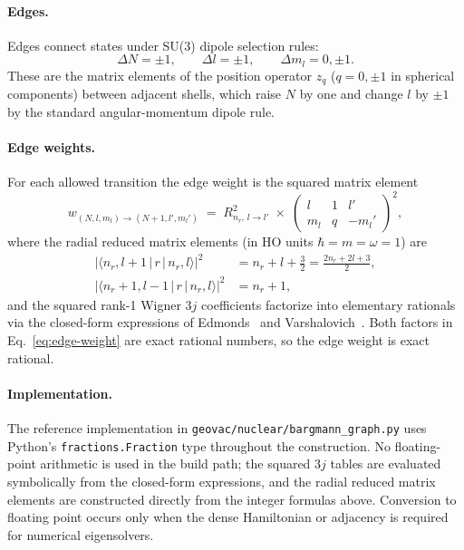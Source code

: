 \documentclass[twocolumn,pra,amsmath,amssymb,superscriptaddress]{revtex4-2}
\begin{document}
\paragraph{Edges.}
Edges connect states under SU(3) dipole selection rules:
\begin{equation}
  \Delta N = \pm 1,
  \qquad
  \Delta l = \pm 1,
  \qquad
  \Delta m_l = 0, \pm 1.
\end{equation}
These are the matrix elements of the position operator $z_q$
($q = 0, \pm 1$ in spherical components) between adjacent shells,
which raise $N$ by one and change $l$ by $\pm 1$ by the standard
angular-momentum dipole rule.

\paragraph{Edge weights.}
For each allowed transition the edge weight is the squared matrix
element
\begin{equation}
  w_{(N,l,m_l) \to (N+1,l',m_l')}
  \;=\;
  R^{2}_{n_r,\, l \to l'}
  \;\times\;
  \begin{pmatrix}
    l & 1 & l' \\
    m_l & q & -m_l'
  \end{pmatrix}^{2},
  \label{eq:edge-weight}
\end{equation}
where the radial reduced matrix elements (in HO units $\hbar = m =
\omega = 1$) are
\begin{align}
  \bigl|\langle n_r, l + 1 \,|\, r \,|\, n_r, l \rangle\bigr|^2
  &= n_r + l + \tfrac{3}{2}
  = \tfrac{2 n_r + 2 l + 3}{2},
  \\[2pt]
  \bigl|\langle n_r + 1, l - 1 \,|\, r \,|\, n_r, l \rangle\bigr|^2
  &= n_r + 1,
\end{align}
and the squared rank-1 Wigner $3j$ coefficients factorize into
elementary rationals via the closed-form expressions of
Edmonds~\cite{edmonds} and Varshalovich~\cite{varshalovich}.  Both
factors in Eq.~\eqref{eq:edge-weight} are exact rational numbers,
so the edge weight is exact rational.

\paragraph{Implementation.}
The reference implementation in
\texttt{geovac/nuclear/bargmann\_graph.py} uses Python's
\texttt{fractions.Fraction} type throughout the construction.  No
floating-point arithmetic is used in the build path; the squared
$3j$ tables are evaluated symbolically from the closed-form
expressions, and the radial reduced matrix elements are constructed
directly from the integer formulas above.  Conversion to floating
point occurs only when the dense Hamiltonian or adjacency is
required for numerical eigensolvers.
\end{document}

